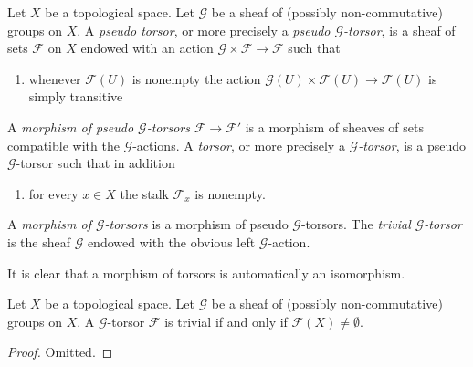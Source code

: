 \begin{definition}
\label{definition-torsor}
Let $X$ be a topological space.
Let $\mathcal{G}$ be a sheaf of (possibly non-commutative) groups on $X$.
A {\it pseudo torsor}, or more precisely a {\it pseudo $\mathcal{G}$-torsor},
is a sheaf of sets $\mathcal{F}$ on $X$ endowed with an action
$\mathcal{G} \times \mathcal{F} \to \mathcal{F}$ such that
\begin{enumerate}
\item whenever $\mathcal{F}(U)$ is nonempty the action
$\mathcal{G}(U) \times \mathcal{F}(U) \to \mathcal{F}(U)$
is simply transitive
\end{enumerate}
A {\it morphism of pseudo $\mathcal{G}$-torsors} $\mathcal{F} \to \mathcal{F}'$
is a morphism of sheaves of sets compatible with the
$\mathcal{G}$-actions. A {\it torsor}, or more precisely a
{\it $\mathcal{G}$-torsor}, is a pseudo $\mathcal{G}$-torsor such
that in addition
\begin{enumerate}
\item[(2)] for every $x \in X$ the stalk $\mathcal{F}_x$ is nonempty.
\end{enumerate}
A {\it morphism of $\mathcal{G}$-torsors} is a morphism of
pseudo $\mathcal{G}$-torsors. The {\it trivial $\mathcal{G}$-torsor}
is the sheaf $\mathcal{G}$ endowed with the obvious left
$\mathcal{G}$-action.
\end{definition}

\noindent
It is clear that a morphism of torsors is automatically an isomorphism.

\begin{lemma}
\label{lemma-trivial-torsor}
Let $X$ be a topological space.
Let $\mathcal{G}$ be a sheaf of (possibly non-commutative) groups on $X$.
A $\mathcal{G}$-torsor $\mathcal{F}$ is trivial if and only if
$\mathcal{F}(X) \not = \emptyset$.
\end{lemma}

\begin{proof}
Omitted.
\end{proof}


